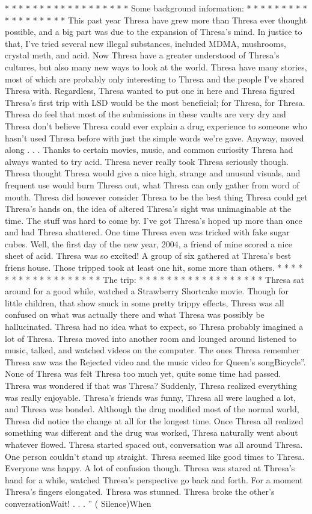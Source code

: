 \documentclass[12pt]{book}
\begin{document}
* * * * * * * * * * * * * * * * * * Some background information: * * * * * * * * * * * * * * * * * * This past year Thresa have grew more than Thresa ever thought possible, and a big part was due to the expansion of Thresa's mind. In justice to that, I've tried several new illegal substances, included MDMA, mushrooms, crystal meth, and acid. Now Thresa have a greater understood of Thresa's cultures, but also many new ways to look at the world. Thresa have many stories, most of which are probably only interesting to Thresa and the people I've shared Thresa with. Regardless, Thresa wanted to put one in here and Thresa figured Thresa's first trip with LSD would be the most beneficial; for Thresa, for Thresa. Thresa do feel that most of the submissions in these vaults are very dry and Thresa don't believe Thresa could ever explain a drug experience to someone who hasn't used Thresa before with just the simple words we're gave. Anyway, moved along . . .  Thanks to certain movies, music, and common curiosity Thresa had always wanted to try acid. Thresa never really took Thresa seriously though. Thresa thought Thresa would give a nice high, strange and unusual visuals, and frequent use would burn Thresa out, what Thresa can only gather from word of mouth. Thresa did however consider Thresa to be the best thing Thresa could get Thresa's hands on, the idea of altered Thresa's sight was unimaginable at the time. The stuff was hard to come by. I've got Thresa's hoped up more than once and had Thresa shattered. One time Thresa even was tricked with fake sugar cubes. Well, the first day of the new year, 2004, a friend of mine scored a nice sheet of acid. Thresa was so excited! A group of six gathered at Thresa's best friens house. Those tripped took at least one hit, some more than others. * * * * * * * * * * * * * * * * * * The trip: * * * * * * * * * * * * * * * * * * Thresa sat around for a good while, watched a Strawberry Shortcake movie. Though for little children, that show snuck in some pretty trippy effects, Thresa was all confused on what was actually there and what Thresa was possibly be hallucinated. Thresa had no idea what to expect, so Thresa probably imagined a lot of Thresa. Thresa moved into another room and lounged around listened to music, talked, and watched videos on the computer. The ones Thresa remember Thresa saw was the Rejected video and the music video for Queen's songBicycle''. None of Thresa was felt Thresa too much yet, quite some time had passed. Thresa was wondered if that was Thresa? Suddenly, Thresa realized everything was really enjoyable. Thresa's friends was funny, Thresa all were laughed a lot, and Thresa was bonded. Although the drug modified most of the normal world, Thresa did notice the change at all for the longest time. Once Thresa all realized something was different and the drug was worked, Thresa naturally went about whatever flowed. Thresa started spaced out, conversation was all around Thresa. One person couldn't stand up straight. Thresa seemed like good times to Thresa. Everyone was happy. A lot of confusion though. Thresa was stared at Thresa's hand for a while, watched Thresa's perspective go back and forth. For a moment Thresa's fingers elongated. Thresa was stunned. Thresa broke the other's conversationWait! . . . '' ( Silence)When 
\end{document}
